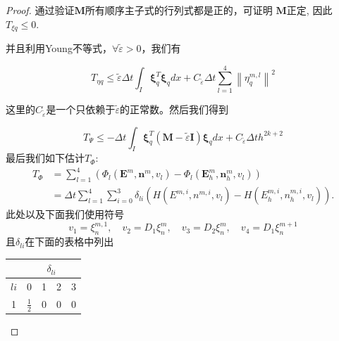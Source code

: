 \begin{proof}
    通过验证$\boldsymbol{M}$所有顺序主子式的行列式都是正的，可证明 $\boldsymbol{M}$正定, 因此 $T_{\xi q} \leq 0$.

    并且利用Young不等式，$\forall \tilde{\varepsilon}>0$，我们有

    \begin{equation*}
        T_{\eta q} \leq \tilde{\varepsilon} \Delta t \int_{I} \boldsymbol{\xi}_{q}^{T} \boldsymbol{\xi}_{q} d x+C_{\tilde{\varepsilon}} \Delta t \sum_{l=1}^{4}\left\|\eta_{q}^{m, l}\right\|^{2}
    \end{equation*}

    这里的$C_{\tilde{\varepsilon}}$是一个只依赖于$\tilde{\varepsilon}$的正常数。然后我们得到

    \begin{equation}
        T_{\Psi} \leq-\Delta t \int_{I} \boldsymbol{\xi}_{q}^{T}(\boldsymbol{M}-\tilde{\varepsilon} \boldsymbol{I}) \boldsymbol{\xi}_{q} d x+C_{\tilde{\varepsilon}} \Delta t h^{2 k+2}
    \end{equation}
    最后我们如下估计$T_{\Phi}$:
    $$
        \begin{aligned}
            T_{\Phi} & =\sum_{l=1}^{4}\left(\Phi_{l}\left(\boldsymbol{E}^{m}, \boldsymbol{n}^{m}, v_{l}\right)-\Phi_{l}\left(\boldsymbol{E}_{h}^{m}, \boldsymbol{n}_{h}^{m}, v_{l}\right)\right) \\
                     & =\Delta t \sum_{l=1}^{4} \sum_{i=0}^{3} \delta_{l i}\left(H\left(E^{m, i}, n^{m, i}, v_{l}\right)-H\left(E_{h}^{m, i}, n_{h}^{m, i}, v_{l}\right)\right) .
        \end{aligned}
    $$
    此处以及下面我们使用符号
    \begin{equation*}
        v_{1}=\xi_{n}^{m, 1}, \quad v_{2}=D_{1} \xi_{n}^{m}, \quad v_{3}=D_{2} \xi_{n}^{m}, \quad v_{4}=D_{1} \xi_{n}^{m+1}
    \end{equation*}
    且$\delta_{l i}$在下面的表格中列出
    \begin{center}
        \begin{tabular}{|c|c|c|c|c|}
            \hline
                  & \multicolumn{4}{|c|}{$\delta_{l i}$}                                                     \\
            \hline
            $l i$ & 0                                    & 1                & 2             & 3              \\
            \hline
            1     & $\frac{1}{2}$                        & 0                & 0             & 0              \\

\end{tabular}
\end{center}
\end{proof}
